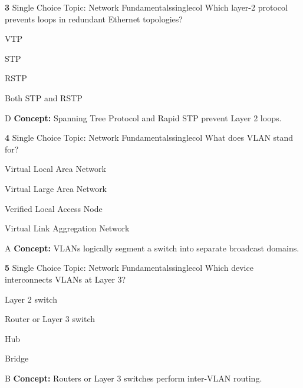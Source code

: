 \documentclass[10pt,a4paper]{article}
\begin{document}
\begin{qcard}{\color{white}\textbf{3} \hfill \small Single Choice \textbar{} Topic: Network Fundamentals}{singlecol}
Which layer-2 protocol prevents loops in redundant Ethernet topologies?

\begin{qoptions}
\item VTP
\item STP
\item RSTP
\item Both STP and RSTP
\end{qoptions}
\begin{explainbox}{D}
\textbf{Concept:} Spanning Tree Protocol and Rapid STP prevent Layer 2 loops.
\end{explainbox}
\end{qcard}

\begin{qcard}{\color{white}\textbf{4} \hfill \small Single Choice \textbar{} Topic: Network Fundamentals}{singlecol}
What does VLAN stand for?

\begin{qoptions}
\item Virtual Local Area Network
\item Virtual Large Area Network
\item Verified Local Access Node
\item Virtual Link Aggregation Network
\end{qoptions}
\begin{explainbox}{A}
\textbf{Concept:} VLANs logically segment a switch into separate broadcast domains.
\end{explainbox}
\end{qcard}

\begin{qcard}{\color{white}\textbf{5} \hfill \small Single Choice \textbar{} Topic: Network Fundamentals}{singlecol}
Which device interconnects VLANs at Layer 3?

\begin{qoptions}
\item Layer 2 switch
\item Router or Layer 3 switch
\item Hub
\item Bridge
\end{qoptions}
\begin{explainbox}{B}
\textbf{Concept:} Routers or Layer 3 switches perform inter-VLAN routing.
\end{explainbox}
\end{qcard}
\end{document}
